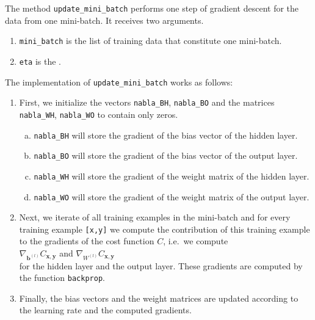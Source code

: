 The method \texttt{update\_mini\_batch} performs one step of gradient descent for the data from one mini-batch.
It receives two arguments.
\begin{enumerate}
\item \texttt{mini\_batch} is the list of training data that constitute one mini-batch.
\item \texttt{eta} is the .
\end{enumerate}
The implementation of \texttt{update\_mini\_batch} works as follows:
\begin{enumerate}
\item First, we initialize the vectors \texttt{nabla\_BH}, \texttt{nabla\_BO} and the matrices
      \texttt{nabla\_WH}, \texttt{nabla\_WO} to contain only zeros.
      \begin{enumerate}[(a)]
      \item \texttt{nabla\_BH} will store the gradient of the bias vector of the hidden layer.
      \item \texttt{nabla\_BO} will store the gradient of the bias vector of the output layer.
      \item \texttt{nabla\_WH} will store the gradient of the weight matrix of the hidden layer.
      \item \texttt{nabla\_WO} will store the gradient of the weight matrix of the output layer.
      \end{enumerate}
\item Next, we iterate of all training examples in the mini-batch and for every training example
      \texttt{[x,y]} we compute the contribution of this training example to the gradients of the
      cost function $C$, i.e.~we compute
      \\[0.2cm]
      \hspace*{1.3cm}
      $\nabla_{\mathbf{b}^{(l)}} C_{\mathbf{x}, \mathbf{y}}$ \quad and \quad  $\nabla_{W^{(l)}} C_{\mathbf{x},
        \mathbf{y}}$ 
      \\[0.2cm]
      for the hidden layer and the output layer.  These gradients are computed by the function
      \texttt{backprop}.
\item Finally, the bias vectors and the weight matrices are updated according to the learning rate and the
      computed gradients.
\end{enumerate}


